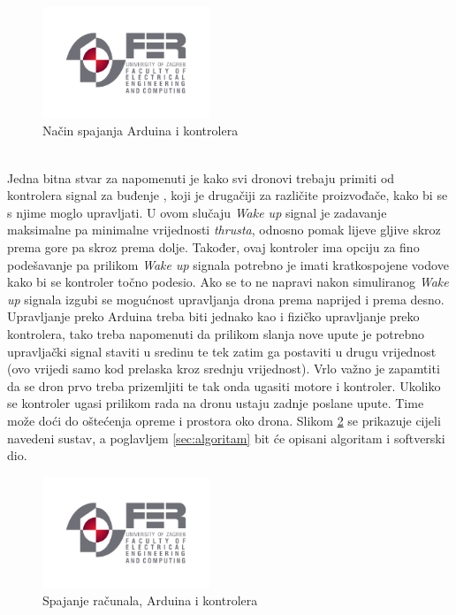 \documentclass[times, utf8, diplomski]{fer}
\begin{document}
\begin{figure}[htb]
\centering
\includegraphics[width=5cm]{img/fer_logo.jpg}
\caption{Način spajanja Arduina i kontrolera\protect\footnotemark}
\label{fig:spajanje}
\end{figure}\\
Jedna bitna stvar za napomenuti je kako svi dronovi trebaju primiti od kontrolera signal za buđenje , koji je drugačiji za različite proizvođače, kako bi se s njime moglo upravljati. U ovom slučaju \emph{Wake up} signal je zadavanje maksimalne pa minimalne vrijednosti \emph{thrusta}, odnosno pomak lijeve gljive skroz prema gore pa skroz prema dolje. Također, ovaj kontroler ima opciju za fino podešavanje pa prilikom \emph{Wake up} signala potrebno je imati kratkospojene vodove kako bi se kontroler točno podesio. Ako se to ne napravi nakon simuliranog \emph{Wake up} signala izgubi se mogućnost upravljanja drona prema naprijed i prema desno. Upravljanje preko Arduina treba biti jednako kao i fizičko upravljanje preko kontrolera, tako treba napomenuti da prilikom slanja nove upute  je potrebno upravljački signal staviti u sredinu te tek zatim ga postaviti u drugu vrijednost (ovo vrijedi samo kod prelaska kroz srednju vrijednost). Vrlo važno je zapamtiti da se dron prvo treba prizemljiti te tak onda ugasiti motore i kontroler. Ukoliko se kontroler ugasi prilikom rada na dronu ustaju zadnje poslane upute. Time može doći do oštećenja opreme i prostora oko drona. Slikom \ref{fig:cijeli sustav} se prikazuje cijeli navedeni sustav, a poglavljem \ref{sec:algoritam} bit će opisani algoritam i softverski dio.
\begin{figure}[htb]
\centering
\includegraphics[width=5cm]{img/fer_logo.jpg}
\caption{Spajanje računala, Arduina i kontrolera\protect\footnotemark}
\label{fig:cijeli sustav}
\end{figure}\\
\end{document}
